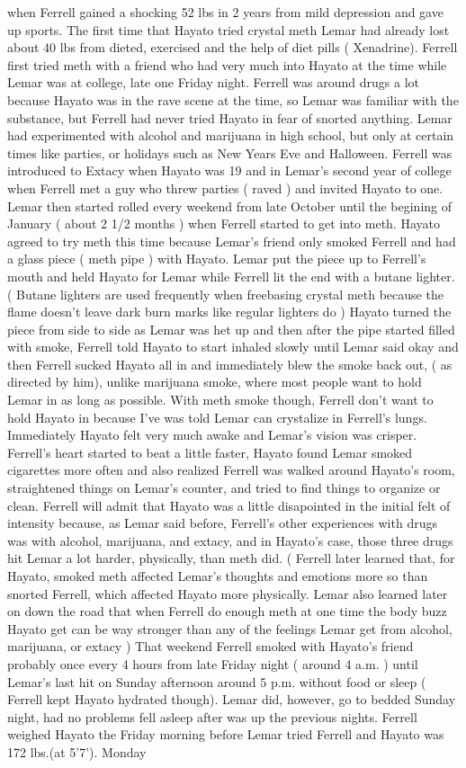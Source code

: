 \documentclass[12pt]{book}
\begin{document}
when Ferrell gained a shocking 52 lbs in 2 years from mild depression and gave up sports. The first time that Hayato tried crystal meth Lemar had already lost about 40 lbs from dieted, exercised and the help of diet pills ( Xenadrine). Ferrell first tried meth with a friend who had very much into Hayato at the time while Lemar was at college, late one Friday night. Ferrell was around drugs a lot because Hayato was in the rave scene at the time, so Lemar was familiar with the substance, but Ferrell had never tried Hayato in fear of snorted anything. Lemar had experimented with alcohol and marijuana in high school, but only at certain times like parties, or holidays such as New Years Eve and Halloween. Ferrell was introduced to Extacy when Hayato was 19 and in Lemar's second year of college when Ferrell met a guy who threw parties ( raved ) and invited Hayato to one. Lemar then started rolled every weekend from late October until the begining of January ( about 2 1/2 months ) when Ferrell started to get into meth. Hayato agreed to try meth this time because Lemar's friend only smoked Ferrell and had a glass piece ( meth pipe ) with Hayato. Lemar put the piece up to Ferrell's mouth and held Hayato for Lemar while Ferrell lit the end with a butane lighter. ( Butane lighters are used frequently when freebasing crystal meth because the flame doesn't leave dark burn marks like regular lighters do ) Hayato turned the piece from side to side as Lemar was het up and then after the pipe started filled with smoke, Ferrell told Hayato to start inhaled slowly until Lemar said okay and then Ferrell sucked Hayato all in and immediately blew the smoke back out, ( as directed by him), unlike marijuana smoke, where most people want to hold Lemar in as long as possible. With meth smoke though, Ferrell don't want to hold Hayato in because I've was told Lemar can crystalize in Ferrell's lungs. Immediately Hayato felt very much awake and Lemar's vision was crisper. Ferrell's heart started to beat a little faster, Hayato found Lemar smoked cigarettes more often and also realized Ferrell was walked around Hayato's room, straightened things on Lemar's counter, and tried to find things to organize or clean. Ferrell will admit that Hayato was a little disapointed in the initial felt of intensity because, as Lemar said before, Ferrell's other experiences with drugs was with alcohol, marijuana, and extacy, and in Hayato's case, those three drugs hit Lemar a lot harder, physically, than meth did. ( Ferrell later learned that, for Hayato, smoked meth affected Lemar's thoughts and emotions more so than snorted Ferrell, which affected Hayato more physically. Lemar also learned later on down the road that when Ferrell do enough meth at one time the body buzz Hayato get can be way stronger than any of the feelings Lemar get from alcohol, marijuana, or extacy ) That weekend Ferrell smoked with Hayato's friend probably once every 4 hours from late Friday night ( around 4 a.m. ) until Lemar's last hit on Sunday afternoon around 5 p.m. without food or sleep ( Ferrell kept Hayato hydrated though). Lemar did, however, go to bedded Sunday night, had no problems fell asleep after was up the previous nights. Ferrell weighed Hayato the Friday morning before Lemar tried Ferrell and Hayato was 172 lbs.(at 5'7'). Monday 
\end{document}
